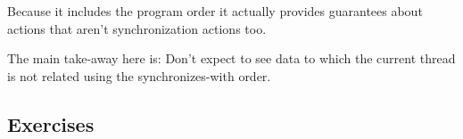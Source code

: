 \documentclass[main]{subfiles}
\begin{document}
Because it includes the program order it actually provides guarantees about actions that aren't synchronization actions too.

The main take-away here is: Don't expect to see data to which the current thread is not related using the synchronizes-with order.

\newpage


\subsection{Exercises}
\end{document}
